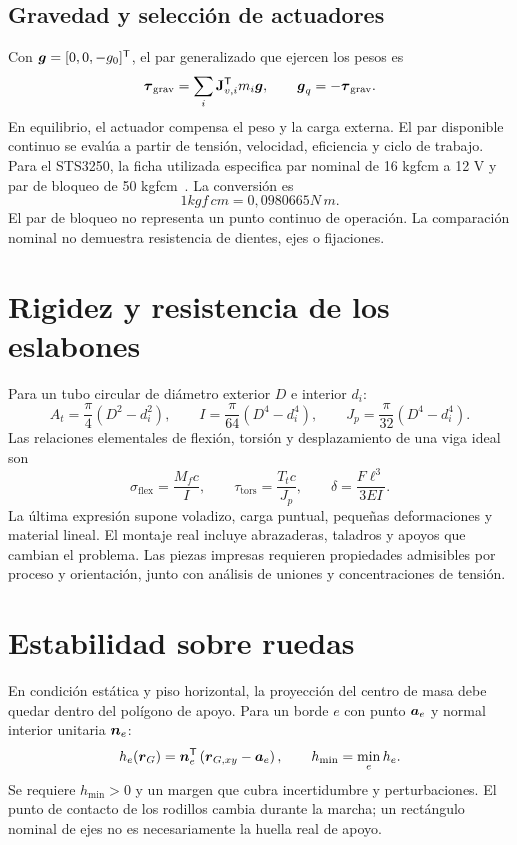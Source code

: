 \subsection{Gravedad y selección de actuadores}
Con $\boldsymbol{g}=[0,0,-g_0]^{\mathsf{T}}$, el par generalizado que ejercen los pesos es
\begin{equation}
\boldsymbol{\tau}_{\mathrm{grav}}=\sum_i\mathbf{J}_{v,i}^{\mathsf{T}}m_i\boldsymbol{g},
\qquad \boldsymbol{g}_q=-\boldsymbol{\tau}_{\mathrm{grav}}.
\end{equation}
En equilibrio, el actuador compensa el peso y la carga externa. El par disponible continuo se evalúa a partir de tensión, velocidad, eficiencia y ciclo de trabajo. Para el STS3250, la ficha utilizada especifica par nominal de 16 kgf\textperiodcentered{}cm a 12 V y par de bloqueo de 50 kgf\textperiodcentered{}cm~\cite{servo}. La conversión es
\begin{equation}
1\unit{kgf\,cm}=0{,}0980665\unit{N\,m}.
\end{equation}
El par de bloqueo no representa un punto continuo de operación. La comparación nominal no demuestra resistencia de dientes, ejes o fijaciones.

\section{Rigidez y resistencia de los eslabones}
Para un tubo circular de diámetro exterior $D$ e interior $d_i$:
\begin{equation}
A_t=\frac{\pi}{4}(D^2-d_i^2),\qquad
I=\frac{\pi}{64}(D^4-d_i^4),\qquad
J_p=\frac{\pi}{32}(D^4-d_i^4).
\end{equation}
Las relaciones elementales de flexión, torsión y desplazamiento de una viga ideal son
\begin{equation}
\sigma_{\mathrm{flex}}=\frac{M_fc}{I},\qquad
\tau_{\mathrm{tors}}=\frac{T_tc}{J_p},\qquad
\delta=\frac{F\ell^3}{3EI}.
\end{equation}
La última expresión supone voladizo, carga puntual, pequeñas deformaciones y material lineal. El montaje real incluye abrazaderas, taladros y apoyos que cambian el problema. Las piezas impresas requieren propiedades admisibles por proceso y orientación, junto con análisis de uniones y concentraciones de tensión.

\section{Estabilidad sobre ruedas}
En condición estática y piso horizontal, la proyección del centro de masa debe quedar dentro del polígono de apoyo. Para un borde $e$ con punto $\boldsymbol{a}_e$ y normal interior unitaria $\boldsymbol{n}_e$:
\begin{equation}
h_e(\boldsymbol{r}_G)=\boldsymbol{n}_e^{\mathsf{T}}\left(\boldsymbol{r}_{G,xy}-\boldsymbol{a}_e\right),
\qquad h_{\min}=\min_eh_e.
\end{equation}
Se requiere $h_{\min}>0$ y un margen que cubra incertidumbre y perturbaciones. El punto de contacto de los rodillos cambia durante la marcha; un rectángulo nominal de ejes no es necesariamente la huella real de apoyo.

